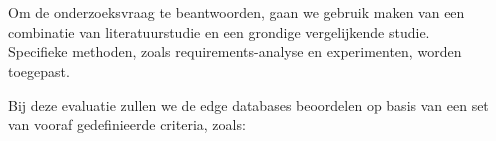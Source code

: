 
\chapter{}%
\label{ch:methodologie}


Om de onderzoeksvraag te beantwoorden, gaan we gebruik maken van een combinatie van literatuurstudie en een grondige vergelijkende studie. \\
 
Specifieke methoden, zoals requirements-analyse en experimenten, worden toegepast.

Bij deze evaluatie zullen we de edge databases beoordelen op basis van een set van vooraf gedefinieerde criteria, zoals:

